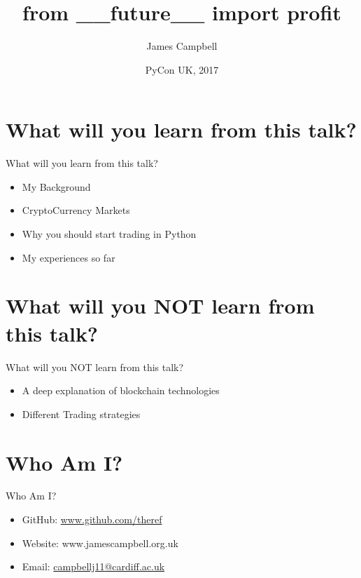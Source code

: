 \documentclass{beamer}
\title{from \_\_future\_\_ import profit}
\author{James Campbell}
\institute[Cardiff University]
  {
  Department of Mathematics\\
  Cardiff University
  }
\date{PyCon UK, 2017}
\begin{document}
\begin{frame}
  \titlepage
\end{frame}



\section{What will you learn from this talk?}

\begin{frame}{What will you learn from this talk?}
  \begin{itemize}
    \item My Background
    \item CryptoCurrency Markets
    \item Why you should start trading in Python
    \item My experiences so far
  \end{itemize}
\end{frame}



\section{What will you NOT learn from this talk?}

\begin{frame}{What will you NOT learn from this talk?}
  \begin{itemize}
    \item A deep explanation of blockchain technologies
    \item Different Trading strategies
  \end{itemize}
\end{frame}



\section{Who Am I?}

\begin{frame}{Who Am I?}
  \begin{itemize}
    \item GitHub: \href{https://github.com/theref}{www.github.com/theref}
    \item Website: www.jamescampbell.org.uk
    \item Email: \href{mailto:campbellj11@cardiff.ac.uk}{campbellj11@cardiff.ac.uk}
  \end{itemize}
\end{frame}
\end{document}
